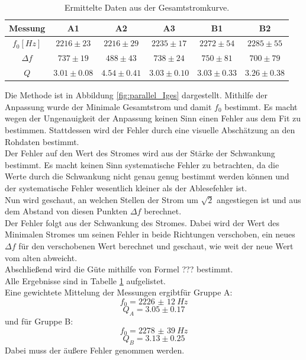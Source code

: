 \documentclass[12pt,a4paper]{article}
\begin{document}
\begin{table}
\centering
\begin{tabular}{|c|c|c|c||c|c|}
\hline
Messung & A1 & A2 & A3 & B1 & B2\\
\hline
$f_0[Hz]$ & $2216\pm 23 $ & $2216\pm 29 $ & $2235\pm 17$ & $2272\pm 54$ & $2285\pm 55$\\
\hline
$\Delta f$ & $737\pm 19 $ & $488\pm 43 $ & $738\pm 24$ & $750\pm 81$ & $700\pm 79$\\
\hline
$Q$ & $3.01\pm 0.08 $ & $4.54\pm 0.41 $ & $3.03\pm 0.10$ & $3.03\pm 0.33$ & $3.26\pm 0.38$\\
\hline
\end{tabular}
\label{tab:parallel_methode1}
\caption{Ermittelte Daten aus der Gesamtstromkurve.}
\end{table}

Die Methode ist in Abbildung \ref{fig:parallel_Iges} dargestellt.
Mithilfe der Anpassung wurde der Minimale Gesamtstrom und damit $f_0$ bestimmt. Es macht wegen der Ungenauigkeit der Anpassung keinen Sinn einen Fehler aus dem Fit zu bestimmen.  Stattdessen wird der Fehler durch eine visuelle Abschätzung an den Rohdaten bestimmt.\\
Der Fehler auf den Wert des Stromes wird aus der Stärke der Schwankung bestimmt. Es macht keinen Sinn systematische Fehler zu betrachten, da die Werte durch die Schwankung nicht genau genug bestimmt werden können und der systematische Fehler wesentlich kleiner als der Ablesefehler ist.\\
Nun wird geschaut, an welchen Stellen der Strom um $\sqrt{2}$ angestiegen ist und aus dem Abstand von diesen Punkten $\Delta f$ berechnet.\\
Der Fehler folgt aus der Schwankung des Stromes. Dabei wird der Wert des Minimalen Stromes um seinen Fehler in beide Richtungen verschoben, ein neues $\Delta f$ für den verschobenen Wert berechnet und geschaut, wie weit der neue Wert vom alten abweicht.\\
Abschließend wird die Güte mithilfe von Formel ??? bestimmt.\\
Alle Ergebnisse sind in Tabelle \ref{tab:parallel_methode1} aufgelistet.\\
Eine gewichtete Mittelung der Messungen ergibtfür Gruppe A:
\begin{equation}
f_0 = \SI{2226(12)}{Hz}
\end{equation}
\begin{equation}
Q_A = 3.05\pm 0.17 
\end{equation}
und für Gruppe B:
\begin{equation}
f_0 = \SI{2278(39)}{Hz}
\end{equation}
\begin{equation}
Q_B = 3.13\pm 0.25 
\end{equation}
Dabei muss der äußere Fehler genommen werden.
\end{document}
